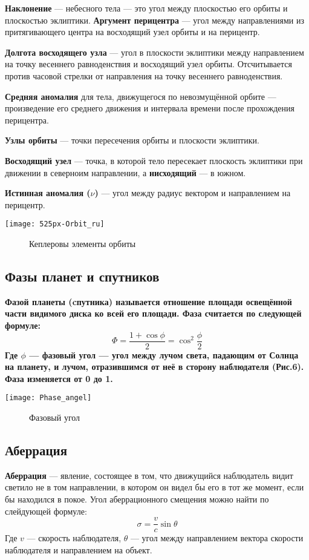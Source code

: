 \documentclass[10pt,a5paper]{article}
\begin{document}
\textbf{Наклонение} --- небесного тела — это угол между плоскостью его орбиты и плоскостью эклиптики.
\textbf{Аргумент перицентра} --- угол между направлениями из притягивающего центра на восходящий узел орбиты и на перицентр.

\textbf{Долгота восходящего узла} --- угол в плоскости эклиптики между направлением на точку весеннего равноденствия и восходящий узел орбиты. Отсчитывается против часовой стрелки от направления на точку весеннего равноденствия.

\textbf{Средняя аномалия} для тела, движущегося по невозмущённой орбите --- произведение его среднего движения и интервала времени после прохождения перицентра.

\textbf{Узлы орбиты} --- точки пересечения орбиты и плоскости эклиптики.

\textbf{Восходящий узел} --- точка, в которой тело пересекает плоскость эклиптики при движении в северноим направлении, а \textbf{нисходящий} --- в южном.

\textbf{Истинная аномалия ($\nu$)} --- угол между радиус вектором и направлением на перицентр.
\begin{center}
\texttt{[image: 525px-Orbit\_ru]}
\begin{figure}[h!]
\caption{Кеплеровы элементы орбиты}
\end{figure}
\end{center}
\subsection*{Фазы планет и спутников}

\bfseries Фазой \mdseries планеты (cпутника) называется отношение площади освещённой  части видимого диска ко всей его площади.
Фаза считается по следующей формуле:
$$\Phi=\frac{1+\cos\phi}{2}=\cos^2\frac{\phi}{2}$$
Где $\phi$ --- \textbf{фазовый угол} --- угол между лучом света, падающим от Солнца на планету, и лучом, отразившимся от неё в сторону наблюдателя (Рис.6). Фаза изменяется от 0 до 1.
\begin{center}
\texttt{[image: Phase\_angel]}
\begin{figure}[h!]
\caption{Фазовый угол}
\end{figure}
\end{center}
\subsection*{Аберрация}

\textbf{Аберрация} --- явление, состоящее в том, что движущийся наблюдатель видит светило не в том направлении, в котором он видел бы его в тот же момент, если бы находился в покое. 
Угол аберрационного смещения можно найти по слейдующей формуле:
$$\sigma=\frac{v}{c}\sin\theta$$
Где $v$ --- скорость наблюдателя, $\theta$ --- угол между направлением вектора скорости наблюдателя и направлением на объект.
\end{document}
